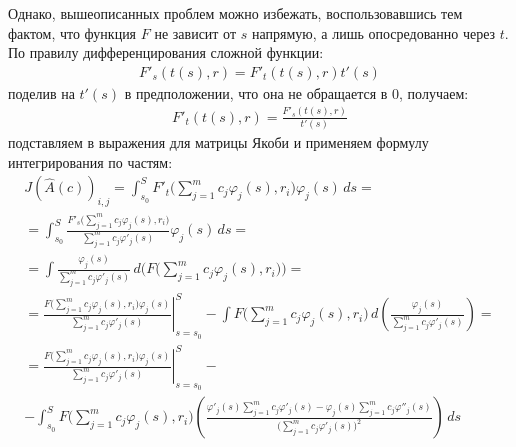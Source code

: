 \documentclass[a4paper,14pt]{extarticle}
\begin{document}
    Однако,  вышеописанных проблем можно избежать, воспользовавшись тем фактом, что функция $F$ не зависит от $s$ напрямую, а лишь опосредованно через $t$. По правилу дифференцирования сложной функции:
    \begin{gather*}
        F'_s(t(s), r) = F'_t(t(s), r) t'(s)
    \end{gather*}
    поделив на $t'(s)$ в предположении, что она не обращается в 0, получаем:
    \begin{gather*}
        F'_t(t(s), r) = \frac{F'_s(t(s), r)}{t'(s)}
    \end{gather*}
    подставляем в выражения для матрицы Якоби и применяем формулу интегрирования по частям:
    \begin{gather*}
        J(\hat{A}(c))_{i, j}
        = \int_{s_0}^{S}
        F'_t
        \Big(
        \sum_{j = 1}^m c_j \varphi_j(s)
        , r_i
        \Big)
        \varphi_j(s)
        \, ds = \\
        = \int_{s_0}^{S}
        \frac{
            F'_s
            \big(
            \sum_{j = 1}^m c_j \varphi_j(s)
            , r_i
            \big)
        }{
            \sum_{j = 1}^m c_j \varphi'_j(s)
        }
        \varphi_j(s)
        \, ds = \\
        = \int
        \frac{
            \varphi_j(s)
        }{
            \sum_{j = 1}^m c_j \varphi'_j(s)
        }
        \, d \bigg(
        F
        \Big(
        \sum_{j = 1}^m c_j \varphi_j(s)
        , r_i
        \Big)
        \bigg) = \\
        = \left.
        \frac{
            F
            \big(
            \sum_{j = 1}^m c_j \varphi_j(s)
            , r_i
            \big)
            \varphi_j(s)
        }{
            \sum_{j = 1}^m c_j \varphi'_j(s)
        }
        \right|_{s = s_0}^S
        -
        \int
        F
        \Big(
        \sum_{j = 1}^m c_j \varphi_j(s)
        , r_i
        \Big)
        \, d\left(
        \frac{
            \varphi_j(s)
        }{
            \sum_{j = 1}^m c_j \varphi'_j(s)
        }
        \right)
        = \\ = \left.
        \frac{
            F
            \big(
            \sum_{j = 1}^m c_j \varphi_j(s)
            , r_i
            \big)
            \varphi_j(s)
        }{
            \sum_{j = 1}^m c_j \varphi'_j(s)
        }
        \right|_{s = s_0}^S
        - \\ -
        \int_{s_0}^{S}
        F
        \Big(
        \sum_{j = 1}^m c_j \varphi_j(s)
        , r_i
        \Big)
        \left(
        \frac{
            \varphi'_j(s)
            \sum_{j = 1}^m c_j \varphi'_j(s)
            -
            \varphi_j(s)
            \sum_{j = 1}^m c_j \varphi''_j(s)
        }{
            \big(
            \sum_{j = 1}^m c_j \varphi'_j(s)
            \big)^2
        }
        \right)
        \, ds
    \end{gather*}
\end{document}
